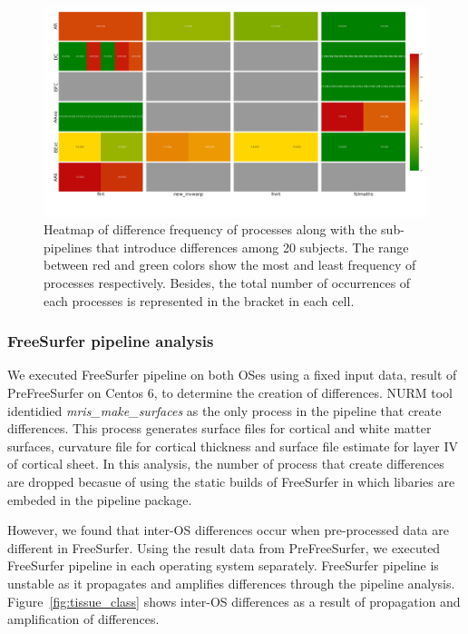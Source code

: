 \documentclass[a4paper,num-refs]{oup-contemporary}
\begin{document}
\begin{figure}
\centering
  \includegraphics[width=\columnwidth]{images/pfs_heatmap.png}
  \caption{Heatmap of difference frequency of processes along with the sub-pipelines that introduce 
           differences among 20 subjects. The range between red and green colors show the most and 
           least frequency of processes respectively. Besides, the total number 
           of occurrences of each processes is represented in the bracket in each cell.}
  \label{fig:pfs_freq}
\end{figure}


\subsubsection{FreeSurfer pipeline analysis} 

We executed FreeSurfer pipeline on both OSes using a fixed input data, result of PreFreeSurfer on Centos 6, 
to determine the creation of differences. 
NURM tool identidied \emph{mris\_make\_surfaces} as the only process in the pipeline that create differences.
This process generates surface files for cortical and white matter surfaces, curvature file for cortical thickness and 
surface file estimate for layer IV of cortical sheet. 
In this analysis, the number of process that create differences are dropped becasue of 
using the static builds of FreeSurfer in which libaries are embeded in the pipeline package.

However, we found that inter-OS differences occur when pre-processed data are different in FreeSurfer. 
Using the result data from PreFreeSurfer, we executed FreeSurfer pipeline in each operating system separately.
FreeSurfer pipeline is unstable as it propagates and amplifies differences 
through the pipeline analysis.
Figure~\ref{fig:tissue_class} shows inter-OS differences  
as a result of propagation and amplification of differences. %
\end{document}
